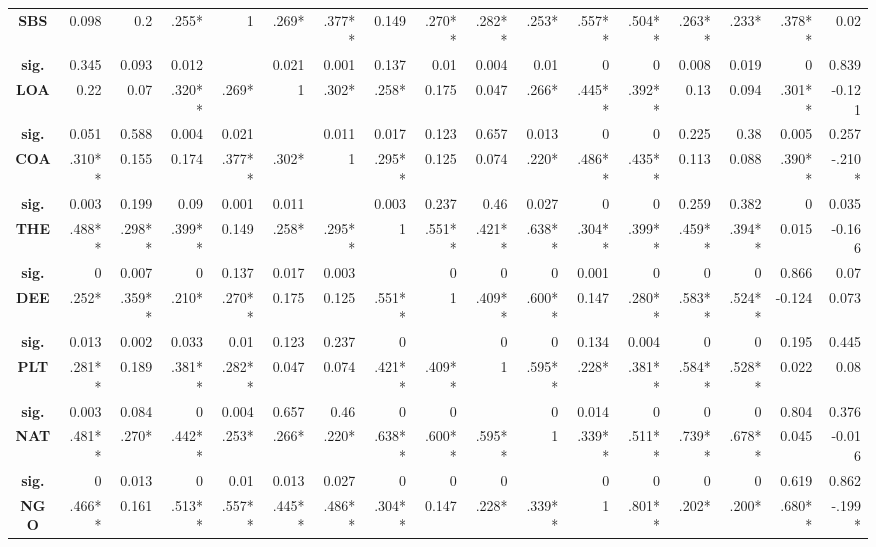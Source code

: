 \documentclass[conference]{IEEEtran}
\begin{document}
\begin{table}[]
{\begin{tabular}{|c|rrrrrr|rrrr|rrrrrr|}
      \textbf{SBS} & 0.098 & 0.2 & .255* & 1 & .269* & .377** & 0.149 & .270** & .282** & .253* & .557** & .504** & .263** & .233* & .378** & 0.02 \\
      \textbf{sig.} & 0.345 & 0.093 & 0.012 &  & 0.021 & 0.001 & 0.137 & 0.01 & 0.004 & 0.01 & 0 & 0 & 0.008 & 0.019 & 0 & 0.839 \\
      \textbf{LOA} & 0.22 & 0.07 & .320** & .269* & 1 & .302* & .258* & 0.175 & 0.047 & .266* & .445** & .392** & 0.13 & 0.094 & .301** & -0.121 \\
      \textbf{sig.} & 0.051 & 0.588 & 0.004 & 0.021 &  & 0.011 & 0.017 & 0.123 & 0.657 & 0.013 & 0 & 0 & 0.225 & 0.38 & 0.005 & 0.257 \\
      \textbf{COA} & .310** & 0.155 & 0.174 & .377** & .302* & 1 & .295** & 0.125 & 0.074 & .220* & .486** & .435** & 0.113 & 0.088 & .390** & -.210* \\
      \textbf{sig.} & 0.003 & 0.199 & 0.09 & 0.001 & 0.011 &  & 0.003 & 0.237 & 0.46 & 0.027 & 0 & 0 & 0.259 & 0.382 & 0 & 0.035 \\ \hline
      \textbf{THE} & .488** & .298** & .399** & 0.149 & .258* & .295** & 1 & .551** & .421** & .638** & .304** & .399** & .459** & .394** & 0.015 & -0.166 \\
      \textbf{sig.} & 0 & 0.007 & 0 & 0.137 & 0.017 & 0.003 &  & 0 & 0 & 0 & 0.001 & 0 & 0 & 0 & 0.866 & 0.07 \\
      \textbf{DEE} & .252* & .359** & .210* & .270** & 0.175 & 0.125 & .551** & 1 & .409** & .600** & 0.147 & .280** & .583** & .524** & -0.124 & 0.073 \\
      \textbf{sig.} & 0.013 & 0.002 & 0.033 & 0.01 & 0.123 & 0.237 & 0 &  & 0 & 0 & 0.134 & 0.004 & 0 & 0 & 0.195 & 0.445 \\
      \textbf{PLT} & .281** & 0.189 & .381** & .282** & 0.047 & 0.074 & .421** & .409** & 1 & .595** & .228* & .381** & .584** & .528** & 0.022 & 0.08 \\
      \textbf{sig.} & 0.003 & 0.084 & 0 & 0.004 & 0.657 & 0.46 & 0 & 0 &  & 0 & 0.014 & 0 & 0 & 0 & 0.804 & 0.376 \\
      \textbf{NAT} & .481** & .270* & .442** & .253* & .266* & .220* & .638** & .600** & .595** & 1 & .339** & .511** & .739** & .678** & 0.045 & -0.016 \\
      \textbf{sig.} & 0 & 0.013 & 0 & 0.01 & 0.013 & 0.027 & 0 & 0 & 0 &  & 0 & 0 & 0 & 0 & 0.619 & 0.862 \\ \hline
      \textbf{NGO} & .466** & 0.161 & .513** & .557** & .445** & .486** & .304** & 0.147 & .228* & .339** & 1 & .801** & .202* & .200* & .680** & -.199* \\

\end{tabular}}
\end{table}
\end{document}

